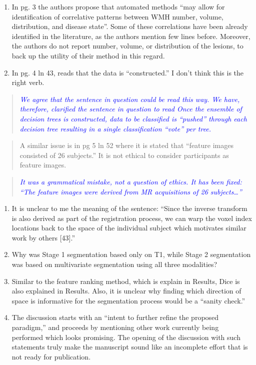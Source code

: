 \documentclass[12pt,]{article}
\begin{document}
\begin{enumerate}
\def\labelenumi{\arabic{enumi}.}
\setcounter{enumi}{8}
\item
  In pg. 3 the authors propose that automated methods ``may allow for
  identification of correlative patterns between WMH number, volume,
  distribution, and disease state''. Some of these correlations have
  been already identified in the literature, as the authors mention few
  lines before. Moreover, the authors do not report number, volume, or
  distribution of the lesions, to back up the utility of their method in
  this regard.
\item
  In pg. 4 ln 43, reads that the data is ``constructed.'' I don't think
  this is the right verb.
\end{enumerate}

\begin{quote}
\emph{\textcolor{blue}{We agree that the sentence in question could be read this way.
We have, therefore, clarified the sentence in question to read
Once the ensemble of decision trees is constructed, data to be classified is ``pushed''
through each decision tree resulting in a single classification ``vote'' per tree.}}
\end{quote}

\begin{quote}
A similar issue is in pg 5 ln 52 where it is stated that ``feature
images consisted of 26 subjects.'' It is not ethical to consider
participants as feature images.
\end{quote}

\begin{quote}
\emph{\textcolor{blue}{It was a grammatical mistake, not a question of
ethics.  It has been fixed: ``The feature images
were derived from MR acquisitions of 26 subjects\ldots''}}
\end{quote}

\begin{enumerate}
\def\labelenumi{\arabic{enumi}.}
\setcounter{enumi}{10}
\item
  It is unclear to me the meaning of the sentence: ``Since the inverse
  transform is also derived as part of the registration process, we can
  warp the voxel index locations back to the space of the individual
  subject which motivates similar work by others {[}43{]}.''
\item
  Why was Stage 1 segmentation based only on T1, while Stage 2
  segmentation was based on multivariate segmentation using all three
  modalities?
\item
  Similar to the feature ranking method, which is explain in Results,
  Dice is also explained in Results. Also, it is unclear why finding
  which direction of space is informative for the segmentation process
  would be a ``sanity check.''
\item
  The discussion starts with an ``intent to further refine the proposed
  paradigm,'' and proceeds by mentioning other work currently being
  performed which looks promising. The opening of the discussion with
  such statements truly make the manuscript sound like an incomplete
  effort that is not ready for publication.
\end{enumerate}
\end{document}
